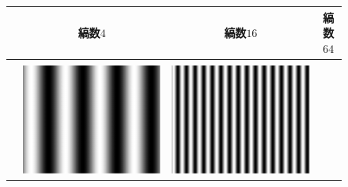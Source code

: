 \newpage
\begin{figure}[H]
    \centering
    \begin{tabularx}{\textwidth}{p{}CCC}
                                                                                          & 縞数\(4\) & 縞数\(16\) & 縞数\(64\) \\
        \hline
        \vspace{.5em}                                                                                                     \\
        \begin{minipage}{.05\textwidth}
            \centering
        \end{minipage}                                                   &
        \begin{minipage}{.25\textwidth}
            \centering
            \includegraphics[width=\textwidth,keepaspectratio]{../../Figures/08_11_img4.pdf}
        \end{minipage}  &
        \begin{minipage}{.25\textwidth}
            \centering
            \includegraphics[width=\textwidth,keepaspectratio]{../../Figures/08_12_img16.pdf}

\end{minipage}
\end{tabularx}
\end{figure}
